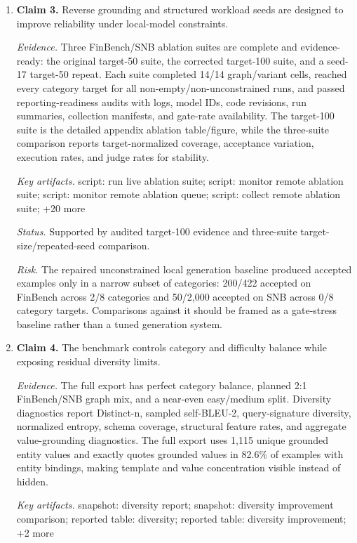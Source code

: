 \begin{enumerate}
\item \textbf{Claim 3.} Reverse grounding and structured workload seeds are designed to improve reliability under local-model constraints.\par
\textit{Evidence.} Three FinBench/SNB ablation suites are complete and evidence-ready: the original target-50 suite, the corrected target-100 suite, and a seed-17 target-50 repeat. Each suite completed 14/14 graph/variant cells, reached every category target for all non-empty/non-unconstrained runs, and passed reporting-readiness audits with logs, model IDs, code revisions, run summaries, collection manifests, and gate-rate availability. The target-100 suite is the detailed appendix ablation table/figure, while the three-suite comparison reports target-normalized coverage, acceptance variation, execution rates, and judge rates for stability.\par
\textit{Key artifacts.} script: run live ablation suite; script: monitor remote ablation suite; script: monitor remote ablation queue; script: collect remote ablation suite; +20 more\par
\textit{Status.} Supported by audited target-100 evidence and three-suite target-size/repeated-seed comparison.\par
\textit{Risk.} The repaired unconstrained local generation baseline produced accepted examples only in a narrow subset of categories: 200/422 accepted on FinBench across 2/8 categories and 50/2,000 accepted on SNB across 0/8 category targets. Comparisons against it should be framed as a gate-stress baseline rather than a tuned generation system.
\item \textbf{Claim 4.} The benchmark controls category and difficulty balance while exposing residual diversity limits.\par
\textit{Evidence.} The full export has perfect category balance, planned 2:1 FinBench/SNB graph mix, and a near-even easy/medium split. Diversity diagnostics report Distinct-n, sampled self-BLEU-2, query-signature diversity, normalized entropy, schema coverage, structural feature rates, and aggregate value-grounding diagnostics. The full export uses 1,115 unique grounded entity values and exactly quotes grounded values in 82.6\% of examples with entity bindings, making template and value concentration visible instead of hidden.\par
\textit{Key artifacts.} snapshot: diversity report; snapshot: diversity improvement comparison; reported table: diversity; reported table: diversity improvement; +2 more\par

\end{enumerate}
